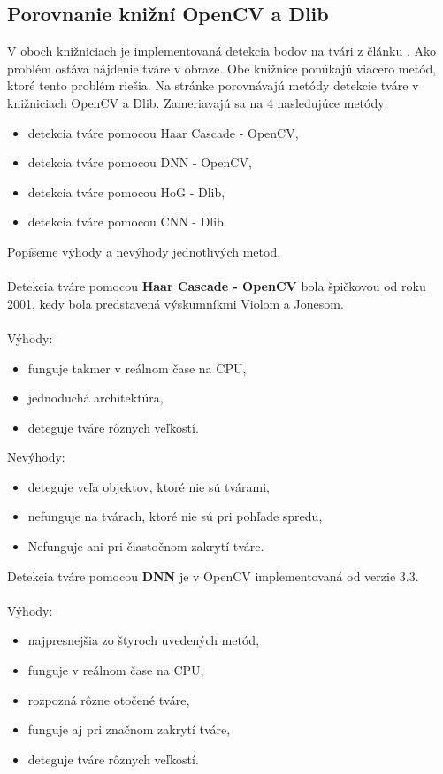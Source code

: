 \subsection{Porovnanie knižní OpenCV a Dlib} \label{OpenCVvsDlibNadpis}
V oboch knižniciach je implementovaná detekcia bodov na tvári z článku \cite{kazemi2014one}.
Ako problém ostáva nájdenie tváre v obraze.
Obe knižnice ponúkajú viacero metód, ktoré tento problém riešia.
Na stránke \cite{OpenCVvsDlib} porovnávajú metódy detekcie tváre v knižniciach OpenCV a Dlib. 
Zameriavajú sa na 4 nasledujúce metódy:
\begin{itemize}
	\item detekcia tváre pomocou Haar Cascade - OpenCV,
	\item detekcia tváre pomocou DNN - OpenCV,
	\item detekcia tváre pomocou HoG - Dlib,
	\item detekcia tváre pomocou CNN - Dlib.\\
\end{itemize}
Popíšeme výhody a nevýhody jednotlivých metod.\\
\\Detekcia tváre pomocou \textbf{Haar Cascade - OpenCV} bola špičkovou od roku 2001, kedy bola predstavená výskumníkmi Violom a Jonesom.\\
\\Výhody:
\begin{itemize}
	\item funguje takmer v reálnom čase na CPU,
	\item jednoduchá architektúra,
	\item deteguje tváre rôznych veľkostí.
\end{itemize}
Nevýhody:
\begin{itemize}
	\item deteguje veľa objektov, ktoré nie sú tvárami,
	\item nefunguje na tvárach, ktoré nie sú pri pohľade spredu,
	\item Nefunguje ani pri čiastočnom zakrytí tváre.\\
\end{itemize}
Detekcia tváre pomocou \textbf{DNN} je v OpenCV implementovaná od verzie 3.3. \\
\\Výhody:
\begin{itemize}
	\item najpresnejšia zo štyroch uvedených metód,
	\item funguje v reálnom čase na CPU,
	\item rozpozná rôzne otočené tváre,
	\item funguje aj pri značnom zakrytí tváre,
	\item deteguje tváre rôznych veľkostí.
\end{itemize}
